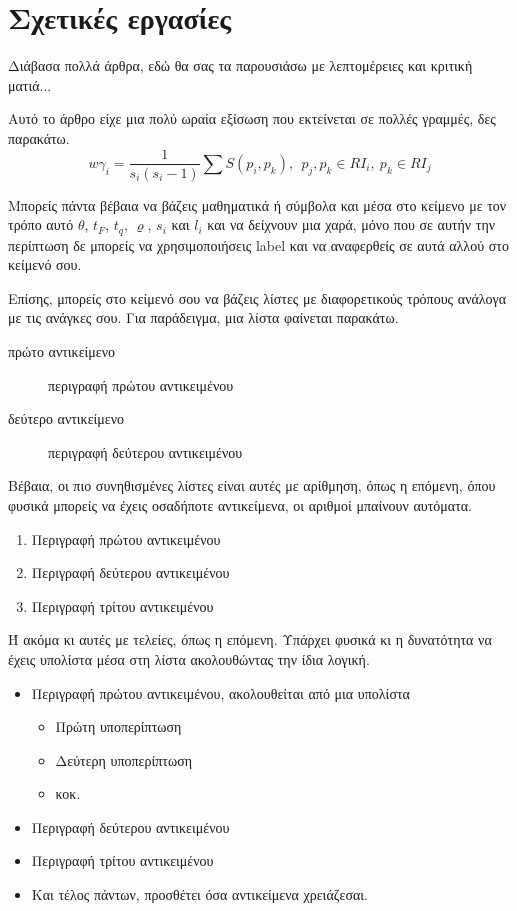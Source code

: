 \section{Σχετικές εργασίες} \label{sec:related-works}
Διάβασα πολλά άρθρα, εδώ θα σας τα παρουσιάσω με λεπτομέρειες και κριτική ματιά...

Αυτό το άρθρο \cite{adams1995hitchhiker} είχε μια πολύ ωραία εξίσωση που εκτείνεται σε πολλές γραμμές, δες παρακάτω.
\begin{equation}\label{eq:weighted-coef} 
w\gamma_i=\frac{1}{s_i(s_i - 1)}\sum{S(p_i,p_k)}, \ \ p_j,p_k \in RI_i,\ p_k \in RI_j
\end{equation}

Μπορείς πάντα βέβαια να βάζεις μαθηματικά ή σύμβολα και μέσα στο κείμενο με τον τρόπο αυτό $\theta$, $t_F$, $t_q$, $\varrho$, $s_i$ και $l_i$ και να δείχνουν μια χαρά, μόνο που σε αυτήν την περίπτωση δε μπορείς να χρησιμοποιήσεις label και να αναφερθείς σε αυτά αλλού στο κείμενό σου. 

Επίσης, μπορείς στο κείμενό σου να βάζεις λίστες με διαφορετικούς τρόπους ανάλογα με τις ανάγκες σου. Για παράδειγμα, μια λίστα φαίνεται παρακάτω.

\begin{description}
    \item[πρώτο αντικείμενο] περιγραφή πρώτου αντικειμένου
    \item[δεύτερο αντικείμενο] περιγραφή δεύτερου αντικειμένου
\end{description}

Βέβαια, οι πιο συνηθισμένες λίστες είναι αυτές με αρίθμηση, όπως η επόμενη, όπου φυσικά μπορείς να έχεις οσαδήποτε αντικείμενα, οι αριθμοί μπαίνουν αυτόματα.

\begin{enumerate}
    \item Περιγραφή πρώτου αντικειμένου
    \item Περιγραφή δεύτερου αντικειμένου
    \item Περιγραφή τρίτου αντικειμένου
\end{enumerate}

Ή ακόμα κι αυτές με  τελείες, όπως η επόμενη. Υπάρχει φυσικά κι η δυνατότητα να έχεις υπολίστα μέσα στη λίστα ακολουθώντας την ίδια λογική. 

\begin{itemize}
    \item Περιγραφή πρώτου αντικειμένου, ακολουθείται από μια υπολίστα
    \begin{itemize}
        \item Πρώτη υποπερίπτωση
        \item Δεύτερη υποπερίπτωση
        \item κοκ.
    \end{itemize}
    \item Περιγραφή δεύτερου αντικειμένου
    \item Περιγραφή τρίτου αντικειμένου
    \item Και τέλος πάντων, προσθέτει όσα αντικείμενα χρειάζεσαι.
\end{itemize}

